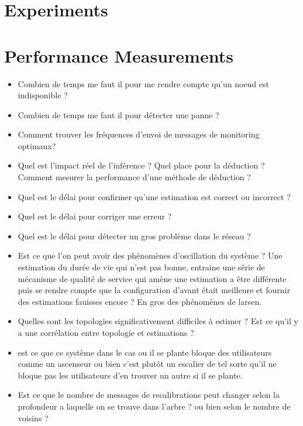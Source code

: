 
\section{Experiments} %
\label{sec:estimators_experiments}

\lipsum


\section{Performance Measurements} %
\label{sec:performance_measurements}

\begin{itemize}
	\item Combien de temps me faut il pour me rendre compte qu'un noeud est indisponible ?
	\item Combien de temps me faut il pour détecter une panne ?
	\item Comment trouver les fréquences d'envoi de messages de monitoring optimaux?
	\item Quel est l'impact réel de l'inférence ? Quel place pour la déduction ? Comment mesurer la performance d'une méthode de déduction ?
	\item Quel est le délai pour confirmer qu'une estimation est correct ou incorrect ?
	\item Quel est le délai pour corriger une erreur ?
	\item Quel est le délai pour détecter un gros problème dans le réseau ?
	\item Est ce que l'on peut avoir des phénomènes d'oscillation du système ? Une estimation
	du durée de vie qui n'est pas bonne, entraine une série de mécanisme de qualité de service qui amène une estimation a être différente puis se rendre compte que la configuration d'avant était meilleure et fournir des estimations fauisses encore ? En gros des phénomènes de larsen.
	\item Quelles sont les topologies significativement difficiles à estimer ? Est ce qu'il y a une corrélation entre topologie et estimations ?

	\item est ce que ce système dans le cas ou il se plante bloque des utilisateurs comme
	un ascenseur ou bien c'est plutôt un escalier de tel sorte qu'il ne bloque pas les utilisateurs d'en trouver un autre si il se plante.

	\item Est ce que le nombre de messages de recalibrations peut changer selon la profondeur a laquelle on se trouve dans l'arbre ? ou bien selon le nombre de voisins ?


\end{itemize}
